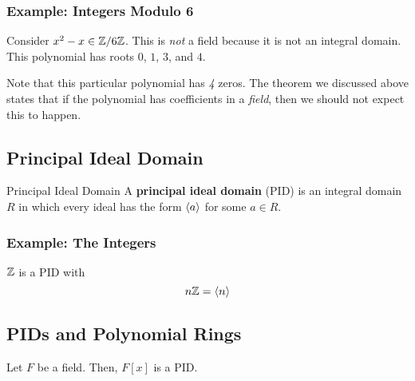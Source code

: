 \documentclass[letterpaper]{article}
\begin{document}
\subsubsection{Example: Integers Modulo 6}
Consider $x^2 - x \in \mathbb{Z} / 6\mathbb{Z}$. This is \emph{not} a field because it is not an integral domain. This polynomial has roots $0$, $1$, $3$, and $4$. 

\bigskip 

Note that this particular polynomial has \emph{4} zeros. The theorem we discussed above states that if the polynomial has coefficients in a \emph{field}, then we should not expect this to happen. 

\subsection{Principal Ideal Domain}
\begin{definition}{Principal Ideal Domain}{}
    A \textbf{principal ideal domain} (PID) is an integral domain $R$ in which every ideal has the form $\langle a \rangle$ for some $a \in R$. 
\end{definition}

\subsubsection{Example: The Integers}
$\mathbb{Z}$ is a PID with 
\[n\mathbb{Z} = \langle n \rangle\]


\subsection{PIDs and Polynomial Rings}
\begin{theorem}{}{}
    Let $F$ be a field. Then, $F[x]$ is a PID. 
\end{theorem}
\end{document}
